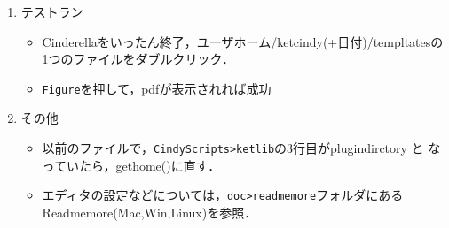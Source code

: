 \documentclass{ujarticle}
\begin{document}
\begin{enumerate}[\bf\large 1.]
\vspace{71mm}

\item テストラン\vspace{-2mm}

\begin{itemize}
 \item Cinderellaをいったん終了，ユーザホーム/ketcindy(+日付)/templtatesの1つのファイルをダブルクリック．
\item\verb|Figure|を押して，pdfが表示されれば成功
\end{itemize}

\item  その他
\begin{itemize}
\item 以前のファイルで，\verb|CindyScripts>ketlib|の3行目がplugindirctory と
なっていたら，gethome()に直す．
\item エディタの設定などについては，\verb|doc>readmemore|フォルダにあるReadmemore(Mac,Win,Linux)を参照．
\end{itemize}
\end{enumerate}
\end{document}
